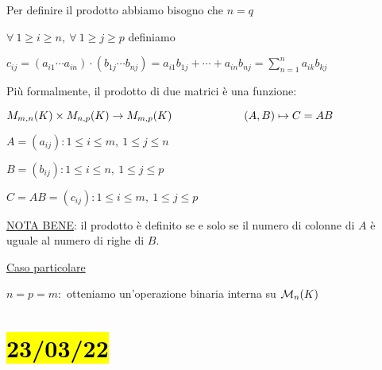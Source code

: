 \documentclass{article}
\begin{document}
{\begin{itemize}
	      Per definire il prodotto abbiamo bisogno che $n=q$

	      $\forall\ 1\ge i\ge n,\ \forall\ 1\ge j\ge p$ definiamo

	      $c_{ij}=(a_{i1}\cdots a_{in})\cdot(b_{1j}\cdots b_{nj})=a_{i1}b_{1j}+\cdots+a_{in}b_{nj}=\sum^n_{n=1}{a_{ik}b_{kj}}$

	      Più formalmente, il prodotto di due matrici è una funzione:

	      $M_{m,n}(K)\times M_{n,p}(K)\rightarrow M_{m,p}(K)\\\hspace*{6.5em}(A,B)\mapsto C=AB$

	      $A=(a_{ij}): 1\le i\le m,\ 1\le j\le n$

	      $B=(b_{ij}): 1\le i\le n,\ 1\le j\le p$

	      $C=AB=(c_{ij}): 1\le i\le m,\ 1\le j\le p$

	      \ul{NOTA BENE}: il prodotto è definito se e solo se il numero di colonne di $A$ è uguale al numero di righe di $B$.

	      \ul{Caso particolare}

	      $n=p=m:$ otteniamo un'operazione binaria interna su $\mathcal{M}_n(K)$
\end{itemize}
}
\section{\hl{23/03/22}}
\end{document}
